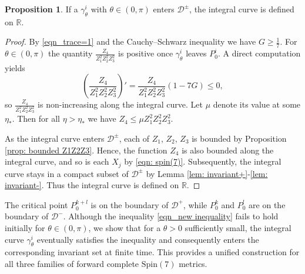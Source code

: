 \documentclass[11pt,letterpaper]{amsart}
\theoremstyle{definition}
\newtheorem{proposition}[theorem]{Proposition}
\numberwithin{equation}{section}
\newcommand{\spin}{\mathrm{Spin}}
\begin{document}
\begin{proposition}
\label{prop_compact subset}
If a $\gamma_\theta^i$ with $\theta\in (0,\pi)$ enters $\mathcal{D}^\pm$, the integral curve is defined on $\mathbb{R}$. 
\end{proposition}
\begin{proof}
By \eqref{eqn_trace=1} and the Cauchy--Schwarz inequality we have $G\ge \tfrac{1}{7}$. For $\theta\in(0,\pi)$ the quantity $\frac{Z_4}{Z_1^2Z_2^2Z_3^2}$ is positive once $\gamma_\theta^i$ leaves $P_0^i$. A direct computation yields
\begin{equation}
\label{eqn_volume_derivative}
\left(\frac{Z_4}{Z_1^2Z_2^2Z_3^2}\right)'=\frac{Z_4}{Z_1^2Z_2^2Z_3^2}(1-7G)\leq 0,
\end{equation}
so $\frac{Z_4}{Z_1^2Z_2^2Z_3^2}$ is non-increasing along the integral curve. Let $\mu$ denote its value at some $\eta_*$. Then for all $\eta>\eta_*$ we have $Z_4\leq \mu Z_1^2Z_2^2Z_3^2$. 

As the integral curve enters $\mathcal{D}^\pm$, each of $Z_1$, $Z_2$, $Z_3$ is bounded by Proposition \ref{prop: bounded Z1Z2Z3}. Hence, the function $Z_4$ is also bounded along the integral curve, and so is each $X_j$ by \eqref{eqn: spin(7)}. Subsequently, the integral curve stays in a compact subset of $\mathcal{D}^\pm$ by Lemma \ref{lem: invariant+}-\ref{lem: invariant-}. Thus the integral curve is defined on $\mathbb{R}$.
\end{proof}

The critical point $P_0^{k+l}$ is on the boundary of $\mathcal{D}^+$, while $P_0^{k}$ and $P_0^{l}$ are on the boundary of $\mathcal{D}^-$. Although the inequality \eqref{eqn_new inequality} fails to hold initially for $\theta\in (0,\pi)$, we show that for a $\theta>0$ sufficiently small, the integral curve $\gamma_\theta^i$ eventually satisfies the inequality and consequently enters the corresponding invariant set at finite time. This provides a unified construction for all three families of forward complete $\spin(7)$ metrics.
\end{document}
